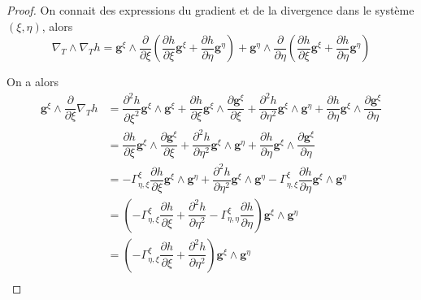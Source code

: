 \begin{proof}
On connait des expressions du gradient et de la divergence dans le système $(\xi, \eta)$, alors
\begin{equation}
\nabla_T \wedge \nabla_T h = \mathbf{g}^{\xi} \wedge \dfrac{\partial}{\partial \xi} \left( \dfrac{\partial h}{\partial \xi} \mathbf{g}^{\xi} + \dfrac{\partial h}{\partial \eta} \mathbf{g}^{\eta}\right) + \mathbf{g}^{\eta} \wedge \dfrac{\partial}{\partial \eta} \left( \dfrac{\partial h}{\partial \xi} \mathbf{g}^{\xi} + \dfrac{\partial h}{\partial \eta} \mathbf{g}^{\eta}\right)
\end{equation}

On a alors
\begin{align*}
\mathbf{g}^{\xi} \wedge \dfrac{\partial}{\partial \xi} \nabla_T h & = \dfrac{\partial^2 h}{\partial \xi^2} \mathbf{g}^{\xi} \wedge \mathbf{g}^{\xi} + \dfrac{\partial h}{\partial \xi} \mathbf{g}^{\xi} \wedge \dfrac{\partial \mathbf{g}^{\xi}}{\partial \xi} + \dfrac{\partial^2 h}{\partial \eta^2} \mathbf{g}^{\xi} \wedge \mathbf{g}^{\eta} + \dfrac{\partial h}{\partial \eta} \mathbf{g}^{\xi} \wedge \dfrac{\partial \mathbf{g}^{\xi}}{\partial \eta}\\
& = \dfrac{\partial h}{\partial \xi} \mathbf{g}^{\xi} \wedge \dfrac{\partial \mathbf{g}^{\xi}}{\partial \xi} + \dfrac{\partial^2 h}{\partial \eta^2} \mathbf{g}^{\xi} \wedge \mathbf{g}^{\eta} + \dfrac{\partial h}{\partial \eta} \mathbf{g}^{\xi} \wedge \dfrac{\partial \mathbf{g}^{\xi}}{\partial \eta}\\
& = - \Gamma_{\eta, \xi}^{\xi} \dfrac{\partial h}{\partial \xi} \mathbf{g}^{\xi} \wedge \mathbf{g}^{\eta} + \dfrac{\partial^2 h}{\partial \eta^2} \mathbf{g}^{\xi} \wedge \mathbf{g}^{\eta} - \Gamma_{\eta, \xi}^{\xi} \dfrac{\partial h}{\partial \eta} \mathbf{g}^{\xi} \wedge \mathbf{g}^{\eta}\\
& = \left( - \Gamma_{\eta, \xi}^{\xi} \dfrac{\partial h}{\partial \xi} + \dfrac{\partial^2 h}{\partial \eta^2} - \Gamma_{\eta, \eta}^{\xi} \dfrac{\partial h}{\partial \eta} \right) \mathbf{g}^{\xi} \wedge \mathbf{g}^{\eta}\\
& = \left( - \Gamma_{\eta, \xi}^{\xi} \dfrac{\partial h}{\partial \xi} + \dfrac{\partial^2 h}{\partial \eta^2} \right) \mathbf{g}^{\xi} \wedge \mathbf{g}^{\eta}\\
\end{align*}


\end{proof}
